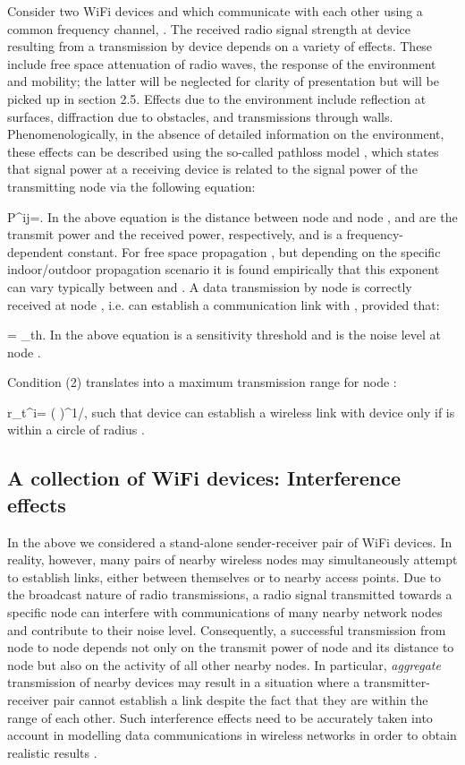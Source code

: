 \documentclass{elsart}
\newcommand{\be}{}
\begin{document}
Consider two WiFi devices  and  which communicate with each
other  using a common frequency channel, . The received radio signal 
strength at device  resulting from  a transmission by device 
depends on  a variety of effects. These include free space attenuation of 
radio waves, the response of the environment and mobility; 
the latter will be neglected for clarity of presentation but will 
be picked up in section 2.5. Effects due to the environment include
reflection at surfaces, diffraction due to obstacles, and transmissions 
through walls. Phenomenologically, in the absence of detailed information on 
the environment, these effects can be  described using the so-called pathloss 
model \cite{pathloss},  which states that signal power at a receiving device  is related 
to the signal power of the transmitting node   via the following 
equation:
\be
P^{ij}=.
\ee
In the above equation 
 is the distance between node  and node , 
 and  are the transmit power and the received power, 
respectively, and  is a frequency-dependent 
constant. 
For free space propagation , but depending on the specific 
indoor/outdoor propagation scenario it is found empirically 
that this exponent can vary
typically between  and . A data transmission by node  is correctly 
received at node , i.e.  can establish a communication link with 
, provided that: 
\be
{}=  \ge \beta_{th}.  
\ee
In the above equation 
 is a sensitivity threshold and  is the noise level at 
node .

Condition (2) translates into a maximum transmission range for node :
\be
r_t^i= \left(  \right)^{1/\alpha},
\ee
such that device   can establish a wireless link with device 
only if  is within a circle of radius . 

\subsection{A collection of WiFi devices: Interference effects}
In the above we considered a stand-alone sender-receiver 
pair of WiFi devices. In reality, however, many pairs of nearby 
wireless nodes may simultaneously attempt to establish links, 
either between themselves or to 
nearby access points.  Due to the broadcast nature of radio transmissions, 
a radio signal transmitted towards a specific node can interfere with communications of many nearby network nodes and contribute to their noise 
level. Consequently, a successful transmission from 
node  to node  depends not only on the transmit power of node  and 
its distance to node  but also on the activity of all other 
nearby nodes. 
In particular, {\it aggregate} transmission
of nearby devices may result in a situation where a transmitter-receiver pair 
cannot establish a link despite the fact that they are within the  range of each other.
Such interference effects need to be accurately taken into account in 
modelling data communications in wireless networks in order 
to obtain realistic results \cite{bogodia1}.
\end{document}
